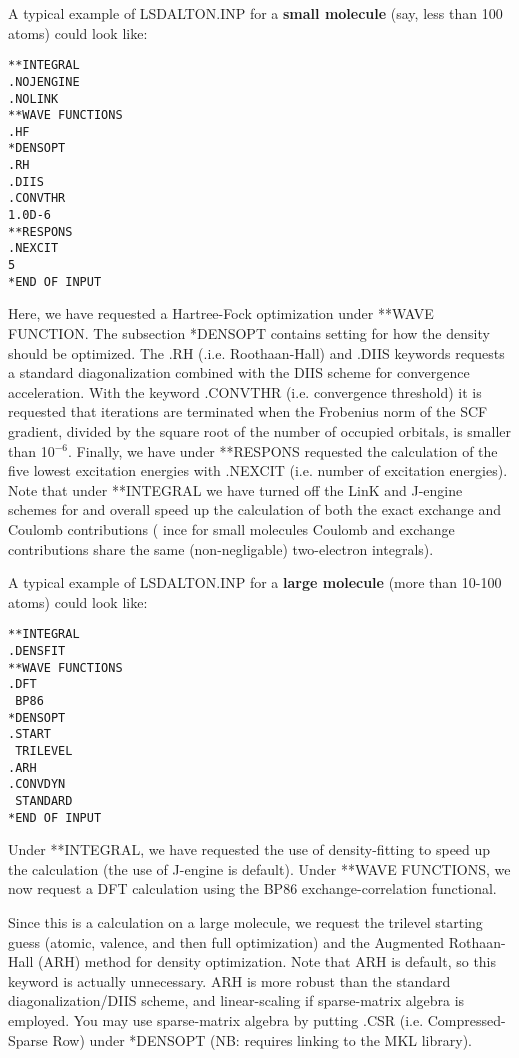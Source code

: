 A typical example of LSDALTON.INP for a {\bf small molecule} (say, less than 100 atoms) could look like:
\begin{verbatim}
**INTEGRAL
.NOJENGINE
.NOLINK
**WAVE FUNCTIONS
.HF
*DENSOPT
.RH
.DIIS
.CONVTHR
1.0D-6
**RESPONS
.NEXCIT
5
*END OF INPUT
\end{verbatim}
Here, we have requested a Hartree-Fock optimization under **WAVE FUNCTION. The subsection
*DENSOPT contains setting for how the density should be optimized. The .RH (.i.e. Roothaan-Hall)
and .DIIS keywords requests a standard diagonalization combined with the DIIS scheme for convergence
acceleration. With the keyword .CONVTHR (i.e. convergence threshold) 
it is requested that iterations are terminated when the 
Frobenius norm of the SCF gradient, divided by the square root of the number of occupied orbitals, 
is smaller than 10$^{-6}$. Finally, we have under **RESPONS requested
the calculation of the five lowest excitation energies with .NEXCIT (i.e. number of excitation energies).
Note that under **INTEGRAL we have turned off the LinK and J-engine schemes for and overall 
speed up the calculation of both the exact exchange and Coulomb contributions ( ince for small 
molecules Coulomb and exchange contributions share the same (non-negligable) two-electron 
integrals).

A typical example of LSDALTON.INP for a {\bf large molecule} (more than 10-100 atoms) could look like: 
\begin{verbatim}
**INTEGRAL
.DENSFIT
**WAVE FUNCTIONS
.DFT
 BP86
*DENSOPT
.START
 TRILEVEL
.ARH
.CONVDYN
 STANDARD
*END OF INPUT
\end{verbatim}
Under **INTEGRAL, we have requested the use of density-fitting to speed up the calculation (the use of J-engine is default). 
Under **WAVE FUNCTIONS, we now request a DFT
calculation using the BP86 exchange-correlation functional.

Since this is a calculation on a large molecule, 
we request the trilevel starting guess (atomic, valence, and then full
optimization) and the Augmented Rothaan-Hall (ARH) method for density optimization. 
Note that ARH is default, so this keyword is actually unnecessary.
ARH is more robust than the standard diagonalization/DIIS scheme, and linear-scaling if sparse-matrix algebra is employed. You may use
sparse-matrix algebra by putting .CSR (i.e. Compressed-Sparse Row) under *DENSOPT (NB: requires linking to the MKL library). 

